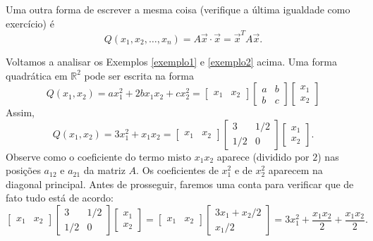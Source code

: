 \documentclass[../livro.tex]{subfiles}
\begin{document}
\noindent Uma outra forma de escrever a mesma coisa (verifique a última igualdade como exercício) é
\begin{equation}
Q(x_1, x_2, \dots, x_n) = A \vec{x}  \cdot \vec{x} = \vec{x}^T A \vec{x}.
\end{equation}


\begin{example}
	Voltamos a analisar os Exemplos \ref{exemplo1} e \ref{exemplo2} acima. Uma forma quadrática em $\mathbb{R}^2$ pode ser escrita na forma
	\begin{equation}
	Q(x_1, x_2) = a x_1^2 + 2 b x_1x_2 + cx_2^2 = 
	\begin{bmatrix}
	x_1 & x_2
	\end{bmatrix}
	\begin{bmatrix}
	a & b \\ b & c
	\end{bmatrix}
	\begin{bmatrix}
	x_1 \\ x_2
	\end{bmatrix}
	\end{equation} Assim,
	\begin{equation}
	Q(x_1, x_2) = 3 x_1^2 + x_1x_2 = 
	\begin{bmatrix}
	x_1 & x_2
	\end{bmatrix}
	\begin{bmatrix}
	3 & 1/2 \\ 
	1/2 & 0
	\end{bmatrix}
	\begin{bmatrix}
	x_1 \\ x_2
	\end{bmatrix}.
	\end{equation} Observe como o coeficiente do termo misto $x_1 x_2$ aparece (dividido por $2$) nas posições $a_{12}$ e $a_{21}$ da matriz $A$. Os coeficientes de $x_1^2$ e de $x_2^2$ aparecem na diagonal principal. Antes de prosseguir, faremos uma conta para verificar que de fato tudo está de acordo:
	\begin{equation}
	\begin{bmatrix}
	x_1 & x_2
	\end{bmatrix}
	\begin{bmatrix}
	3 & 1/2 \\ 
	1/2 & 0
	\end{bmatrix}
	\begin{bmatrix}
	x_1 \\ x_2
	\end{bmatrix} = 
	\begin{bmatrix}
	x_1 & x_2
	\end{bmatrix}
	\begin{bmatrix}
	3x_1 + x_2/2 \\
	x_1/2
	\end{bmatrix} = 3 x_1^2 + \frac{x_1x_2}{2} + \frac{x_1x_2}{2}.
	\end{equation}
	

\end{example}
\end{document}
